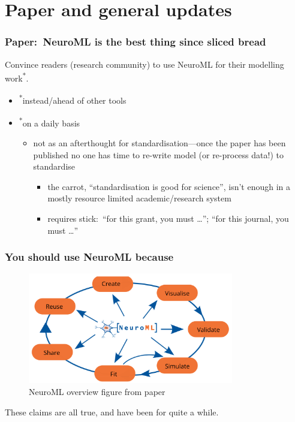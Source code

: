 \section{Paper and general updates}
\begin{frame}[c]
  \frametitle{Paper:\ NeuroML is the best thing since sliced bread}
  \begin{center}
    Convince readers (research community) to use NeuroML for their modelling work\textsuperscript{*}.\\\vspace{2cm}
    \pause{}
    \begin{itemize}
      \item \textsuperscript{*}instead/ahead of other tools
        \pause{}
      \item \textsuperscript{*}on a daily basis
        \begin{itemize}
          \item not as an afterthought for standardisation---once the paper has been published no one has time to re-write model (or re-process data!) to standardise
            \pause{}
            \begin{itemize}
              \item the carrot, \enquote{standardisation is good for science}, isn't enough in a mostly resource limited academic/research system
              \item requires stick:\ \enquote{for this grant, you must \ldots}; \enquote{for this journal, you must \ldots}
            \end{itemize}
        \end{itemize}
    \end{itemize}
  \end{center}
\end{frame}
\begin{frame}[c]
  \frametitle{You should use NeuroML because}
  \begin{figure}[h]
    \centering
    \includegraphics[width=0.8\textwidth]{99_images/neuroml-ecosystem}
    \caption{NeuroML overview figure from paper}%
    \label{fig:99_images-neuroml-ecosystem}
  \end{figure}
  \pause{}
  \begin{center}
    These claims are all true, and have been for quite a while.
  \end{center}
\end{frame}
